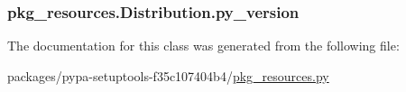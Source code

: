 \subsubsection[{py\+\_\+version}]{\setlength{\rightskip}{0pt plus 5cm}pkg\+\_\+resources.\+Distribution.\+py\+\_\+version}\label{classpkg__resources_1_1Distribution_a94c84ff74167eef63fecce9f5e3c2a85}


The documentation for this class was generated from the following file\+:\begin{DoxyCompactItemize}
\item 
packages/pypa-\/setuptools-\/f35c107404b4/\hyperlink{pkg__resources_8py}{pkg\+\_\+resources.\+py}\end{DoxyCompactItemize}
